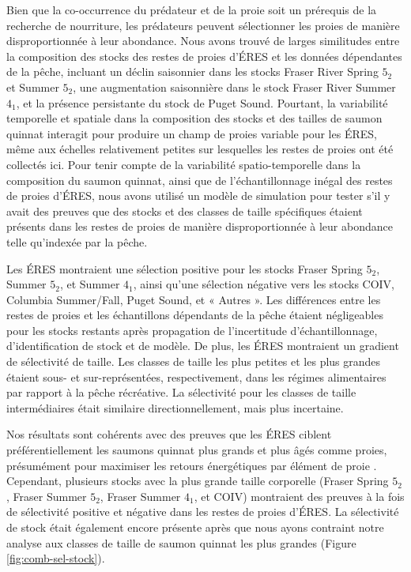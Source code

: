 Bien que la co-occurrence du prédateur et de la proie soit un prérequis de la recherche de nourriture, les prédateurs peuvent sélectionner les proies de manière disproportionnée à leur abondance. Nous avons trouvé de larges similitudes entre la composition des stocks des restes de proies d'ÉRES et les données dépendantes de la pêche, incluant un déclin saisonnier dans les stocks Fraser River Spring $5_2$ et Summer $5_2$, une augmentation saisonnière dans le stock Fraser River Summer $4_1$, et la présence persistante du stock de Puget Sound. Pourtant, la variabilité temporelle et spatiale dans la composition des stocks et des tailles de saumon quinnat interagit pour produire un champ de proies variable pour les ÉRES, même aux échelles relativement petites sur lesquelles les restes de proies ont été collectés ici. Pour tenir compte de la variabilité spatio-temporelle dans la composition du saumon quinnat, ainsi que de l'échantillonnage inégal des restes de proies d'ÉRES, nous avons utilisé un modèle de simulation pour tester s'il y avait des preuves que des stocks et des classes de taille spécifiques étaient présents dans les restes de proies de manière disproportionnée à leur abondance telle qu'indexée par la pêche.

Les ÉRES montraient une sélection positive pour les stocks Fraser Spring $5_2$, Summer $5_2$, et Summer $4_1$, ainsi qu'une sélection négative vers les stocks COIV, Columbia Summer/Fall, Puget Sound, et « Autres ». Les différences entre les restes de proies et les échantillons dépendants de la pêche étaient négligeables pour les stocks restants après propagation de l'incertitude d'échantillonnage, d'identification de stock et de modèle. De plus, les ÉRES montraient un gradient de sélectivité de taille. Les classes de taille les plus petites et les plus grandes étaient sous- et sur-représentées, respectivement, dans les régimes alimentaires par rapport à la pêche récréative. La sélectivité pour les classes de taille intermédiaires était similaire directionnellement, mais plus incertaine.

Nos résultats sont cohérents avec des preuves que les ÉRES ciblent préférentiellement les saumons quinnat plus grands et plus âgés comme proies, présumément pour maximiser les retours énergétiques par élément de proie \citep{fordSelectiveForagingFisheating2006, oneillEnergyContentPacific2014}. Cependant, plusieurs stocks avec la plus grande taille corporelle (Fraser Spring $5_2$, Fraser Summer $5_2$, Fraser Summer $4_1$, et COIV) montraient des preuves à la fois de sélectivité positive et négative dans les restes de proies d'ÉRES. La sélectivité de stock était également encore présente après que nous ayons contraint notre analyse aux classes de taille de saumon quinnat les plus grandes (Figure \ref{fig:comb-sel-stock}).

